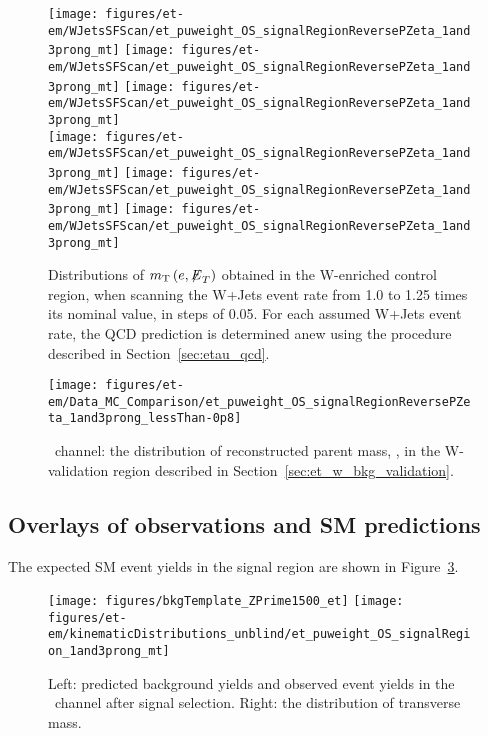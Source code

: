 \begin{figure}[thbp!]\centering
  \texttt{[image: figures/et-em/WJetsSFScan/et\_puweight\_OS\_signalRegionReversePZeta\_1and3prong\_mt]}
  \texttt{[image: figures/et-em/WJetsSFScan/et\_puweight\_OS\_signalRegionReversePZeta\_1and3prong\_mt]}
  \texttt{[image: figures/et-em/WJetsSFScan/et\_puweight\_OS\_signalRegionReversePZeta\_1and3prong\_mt]}\\
  \texttt{[image: figures/et-em/WJetsSFScan/et\_puweight\_OS\_signalRegionReversePZeta\_1and3prong\_mt]}
  \texttt{[image: figures/et-em/WJetsSFScan/et\_puweight\_OS\_signalRegionReversePZeta\_1and3prong\_mt]}
  \texttt{[image: figures/et-em/WJetsSFScan/et\_puweight\_OS\_signalRegionReversePZeta\_1and3prong\_mt]}
  \caption{\label{fig:etau_w_sf} Distributions of
    $m_\mathrm{T}\left(e,{\not\mathrel{E}}_T\right)$ obtained in the W-enriched
    control region, when scanning the W+Jets event rate from 1.0 to
    1.25 times its nominal value, in steps of 0.05.  For each assumed
    W+Jets event rate, the QCD prediction is determined anew using the
    procedure described in Section~\ref{sec:etau_qcd}.}
\end{figure}

\begin{figure}[thbp!]\centering
  \texttt{[image: figures/et-em/Data\_MC\_Comparison/et\_puweight\_OS\_signalRegionReversePZeta\_1and3prong\_lessThan-0p8]}
  \caption{\label{fig:et_meff_flipped_pz} \teth ~channel: the
    distribution of reconstructed parent mass, \meffetau, in the
    W-validation region described in
    Section~\ref{sec:et_w_bkg_validation}.}
\end{figure}

\clearpage
\subsection{Overlays of observations and SM predictions}
\label{sec:et_overlays}

The expected SM event yields in the signal region are shown in
Figure~\ref{fig:etau_sm_template_and_mt}.
\begin{figure}[thbp!]\centering
  \texttt{[image: figures/bkgTemplate\_ZPrime1500\_et]}
  \texttt{[image: figures/et-em/kinematicDistributions\_unblind/et\_puweight\_OS\_signalRegion\_1and3prong\_mt]}
  \caption{\label{fig:etau_sm_template_and_mt} Left: predicted
    background yields and observed event yields in the \teth ~channel
    after signal selection.  Right: the distribution of transverse
    mass.}
\end{figure}

